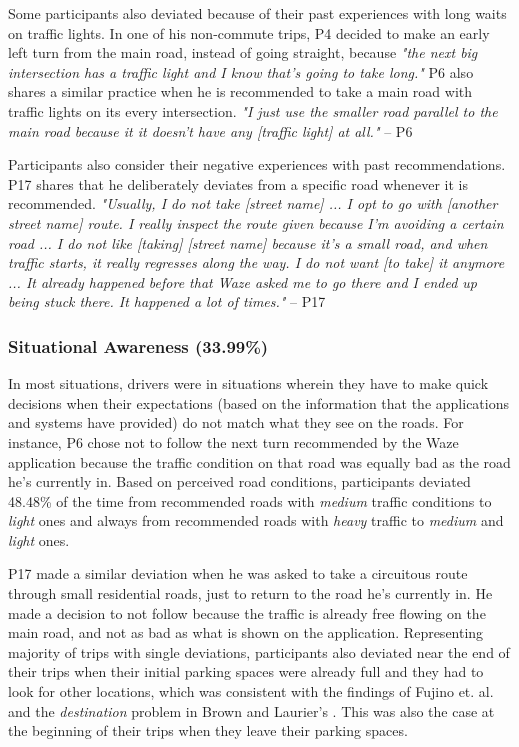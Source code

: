Some participants also deviated because of their past experiences with long waits on traffic lights. In one of his non-commute trips, P4 decided to make an early left turn from the main road, instead of going straight, because \emph{"the next big intersection has a traffic light and I know that's going to take long."} P6 also shares a similar practice when he is recommended to take a main road with traffic lights on its every intersection. \emph{"I just use the smaller road parallel to the main road because it it doesn't have any [traffic light] at all."} -- P6

Participants also consider their negative experiences with past recommendations. P17 shares that he deliberately deviates from a specific road whenever it is recommended. \emph{"Usually, I do not take [street name] ... I opt to go with [another street name] route. I really inspect the route given because I'm avoiding a certain road ... I do not like [taking] [street name] because it's a small road, and when traffic starts, it really regresses along the way. I do not want [to take] it anymore ... It already happened before that Waze asked me to go there and I ended up being stuck there. It happened a lot of times."}  -- P17

\subsubsection{Situational Awareness (33.99\%)}
In most situations, drivers were in situations wherein they have to make quick decisions when their expectations (based on the information that the applications and systems have provided) do not match what they see on the roads. For instance, P6 chose not to follow the next turn recommended by the Waze application because the traffic condition on that road was equally bad as the road he's currently in. Based on perceived road conditions, participants deviated 48.48\% of the time from recommended roads with \emph{medium} traffic conditions to \emph{light} ones and always from recommended roads with \emph{heavy} traffic to \emph{medium} and \emph{light} ones. 

P17 made a similar deviation when he was asked to take a circuitous route through small residential roads, just to return to the road he's currently in. He made a decision to not follow because the traffic is already free flowing on the main road, and not as bad as what is shown on the application. Representing majority of trips with single deviations, participants also deviated near the end of their trips when their initial parking spaces were already full and they had to look for other locations, which was consistent with the findings of Fujino et. al. \cite{Fujino2018DetectingTracks} and the \emph{destination} problem in Brown and Laurier's \cite{Brown2012TheGPS}. This was also the case at the beginning of their trips when they leave their parking spaces.  

